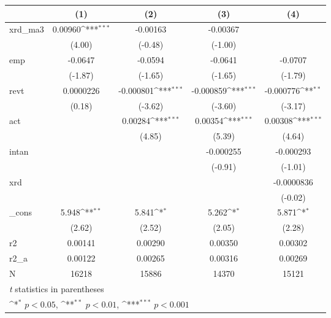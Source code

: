 {
\def\sym#1{\ifmmode^{#1}\else\(^{#1}\)\fi}
\begin{tabular}{l*{4}{c}}
\hline\hline
            &\multicolumn{1}{c}{(1)}         &\multicolumn{1}{c}{(2)}         &\multicolumn{1}{c}{(3)}         &\multicolumn{1}{c}{(4)}         \\
\hline
xrd\_ma3     &     0.00960\sym{***}&    -0.00163         &    -0.00367         &                     \\
            &      (4.00)         &     (-0.48)         &     (-1.00)         &                     \\
[1em]
emp         &     -0.0647         &     -0.0594         &     -0.0641         &     -0.0707         \\
            &     (-1.87)         &     (-1.65)         &     (-1.65)         &     (-1.79)         \\
[1em]
revt        &   0.0000226         &   -0.000801\sym{***}&   -0.000859\sym{***}&   -0.000776\sym{**} \\
            &      (0.18)         &     (-3.62)         &     (-3.60)         &     (-3.17)         \\
[1em]
act         &                     &     0.00284\sym{***}&     0.00354\sym{***}&     0.00308\sym{***}\\
            &                     &      (4.85)         &      (5.39)         &      (4.64)         \\
[1em]
intan       &                     &                     &   -0.000255         &   -0.000293         \\
            &                     &                     &     (-0.91)         &     (-1.01)         \\
[1em]
xrd         &                     &                     &                     &  -0.0000836         \\
            &                     &                     &                     &     (-0.02)         \\
[1em]
\_cons      &       5.948\sym{**} &       5.841\sym{*}  &       5.262\sym{*}  &       5.871\sym{*}  \\
            &      (2.62)         &      (2.52)         &      (2.05)         &      (2.28)         \\
\hline
r2          &     0.00141         &     0.00290         &     0.00350         &     0.00302         \\
r2\_a        &     0.00122         &     0.00265         &     0.00316         &     0.00269         \\
N           &       16218         &       15886         &       14370         &       15121         \\
\hline\hline
\multicolumn{5}{l}{\footnotesize \textit{t} statistics in parentheses}\\
\multicolumn{5}{l}{\footnotesize \sym{*} \(p<0.05\), \sym{**} \(p<0.01\), \sym{***} \(p<0.001\)}\\
\end{tabular}
}
